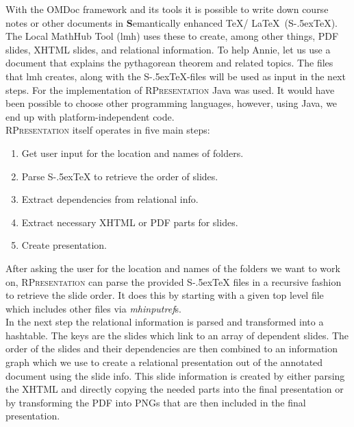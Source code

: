 \documentclass[twoside, 12pt]{article}
\def\stex{\texorpdfstring{\raisebox{-.5ex}S\kern-.5ex\TeX}{sTeX}\xspace}
\def\sTeX{\stex}
\newcommand{\sys}{\textsc{RPresentation}\xspace}
\begin{document}
\begin{figure}
\vspace{-50pt}
\end{figure}

With the OMDoc framework and its tools it is possible to write down course notes or other documents in \textbf{S}emantically enhanced \TeX / \LaTeX\ (\stex). The Local MathHub Tool (lmh) uses these to create, among other things, PDF slides, XHTML slides, and relational information. To help Annie, let us use a document that explains the pythagorean theorem and related topics. The files that lmh creates, along with the \stex -files will be used as input in the next steps. For the implementation of  \sys Java was used. It would have been possible to choose other programming languages, however, using Java, we end up with platform-independent code.\\

\sys itself operates in five main steps:\\
\vspace{-12pt}
\begin{enumerate}[topsep=0pt,itemsep=-1ex,partopsep=1ex,parsep=1ex]
\item Get user input for the location and names of folders.
\item Parse \sTeX to retrieve the order of slides.
\item Extract dependencies from relational info.
\item Extract necessary XHTML or PDF parts for slides.
\item Create presentation.
\end{enumerate}
\vspace{5pt}

After asking the user for the location and names of the folders we want to work on, \sys can parse the provided \stex files in a recursive fashion to retrieve the slide order. It does this by starting with a given top level file which includes other files via \textit{mhinputref}s.\\

In the next step the relational information is parsed and transformed into a hashtable. The keys are the slides which link to an array of dependent slides. The order of the slides and their dependencies are then combined to an information graph which we use to create a relational presentation out of the annotated document using the slide info. This slide information is created by either parsing the XHTML and directly copying the needed parts into the final presentation or by transforming the PDF into PNGs that are then included in the final presentation.\\
\end{document}
